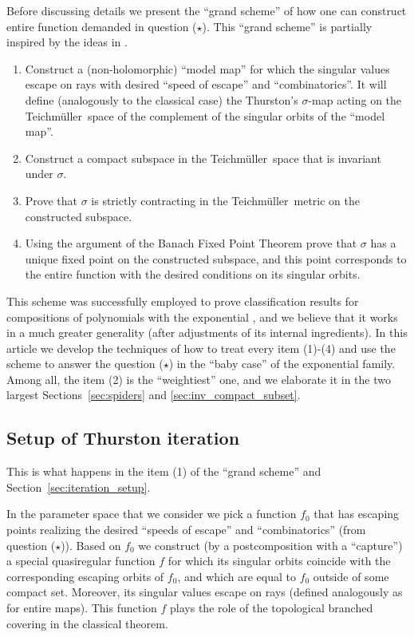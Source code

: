 \documentclass[10pt,reqno,a4paper]{amsart}
\numberwithin{figure}{section}
\numberwithin{equation}{section}
\newcommand{\tei}{Teichm\"uller}
\begin{document}
Before discussing details we present the ``grand scheme'' of how one can construct entire function demanded in question ($\star$). This ``grand scheme'' is partially inspired by the ideas in \cite{MarkusThesis}. 
\begin{enumerate}
	\item Construct a (non-holomorphic) ``model map'' for which the singular values escape on rays with desired ``speed of escape'' and ``combinatorics''. It will define (analogously to the classical case) the Thurston's $\sigma$-map acting on the \tei\ space of the complement of the singular orbits of the ``model map''.
	\item Construct a compact subspace in the \tei\ space that is invariant under $\sigma$.
	\item Prove that $\sigma$ is strictly contracting  in the \tei\ metric on the constructed subspace.
	\item Using the argument of the Banach Fixed Point Theorem prove that $\sigma$ has a unique fixed point on the constructed subspace, and this point corresponds to the entire function with the desired conditions on its singular orbits. 
\end{enumerate}

This scheme was successfully employed to prove classification results for compositions of polynomials with the exponential \cite{MyThesis}, and we believe that it works in a much greater generality (after adjustments of its internal ingredients). In this article we develop the techniques of how to treat every item (1)-(4) and use the scheme to answer the question ($\star$) in the ``baby case'' of the exponential family. Among all, the item (2) is the ``weightiest'' one, and we elaborate it in the two largest Sections~\ref{sec:spiders} and \ref{sec:inv_compact_subset}.

\subsection*{Setup of Thurston iteration}

This is what happens in the item (1) of the ``grand scheme'' and Section~\ref{sec:iteration_setup}.

In the parameter space that we consider we pick a function $f_0$ that has escaping points realizing the desired ``speeds of escape'' and ``combinatorics'' (from question ($\star$)). Based on $f_0$ we construct (by a postcomposition with a ``capture'') a special quasiregular function $f$ for which its singular orbits coincide with the corresponding escaping orbits of $f_0$, and which are equal to $f_0$ outside of some compact set. Moreover, its singular values escape on rays (defined analogously as for entire maps). This function $f$ plays the role of the topological branched covering in the classical theorem.
\end{document}
